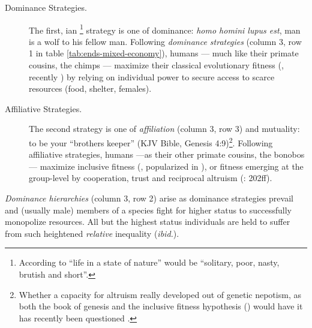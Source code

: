 \begin{description}
	\item[Dominance Strategies.] The first, \citeauthor{Hobbes-1651-aa}ian \citeyearpar{Hobbes-1651-aa}\footnote{
		According to \cite{Hobbes-1651-aa} ``life in a state of nature'' would be ``solitary, poor, nasty, brutish and short''.}
	strategy is one of dominance: \emph{homo homini lupus est}, man is a wolf to his fellow man. Following \emph{dominance strategies} (column 3, row 1 in table \ref{tab:ends-mixed-economy}), humans --- much like their primate cousins, the chimps --- maximize their classical evolutionary fitness (\citealt{Darwin1859}, recently \citealt{Dawkins1976}) by relying on individual power to secure access to scarce resources (food, shelter, females).

	\item[Affiliative Strategies.] The second strategy is one of \emph{affiliation} (column 3, row 3) and mutuality: to be your ``brothers keeper'' (\gls{KJV} Bible, Genesis 4:9)\footnote{
		Whether a capacity for altruism really developed out of genetic nepotism, as both the book of genesis and the inclusive fitness hypothesis (\citealt{Hamilton1964,Wilson1975}) would have it has recently been questioned \citep{Wilson2012}.}. Following affiliative strategies, humans ---as their other primate cousins, the bonobos --- maximize inclusive fitness (\citealt{Hamilton1964}, popularized in \citealt{Wilson1975}), or fitness emerging at the group-level \citep{Wilson2012} by cooperation, trust and reciprocal altruism (\citealt{Pickett-2009-kx}: 202ff).
\end{description}

\emph{Dominance hierarchies} (column 3, row 2) arise as dominance strategies prevail and (usually male) members of a species fight for higher status to successfully monopolize resources.  All but the highest status individuals are held to suffer from such heightened \emph{relative} inequality (\emph{ibid.}).

